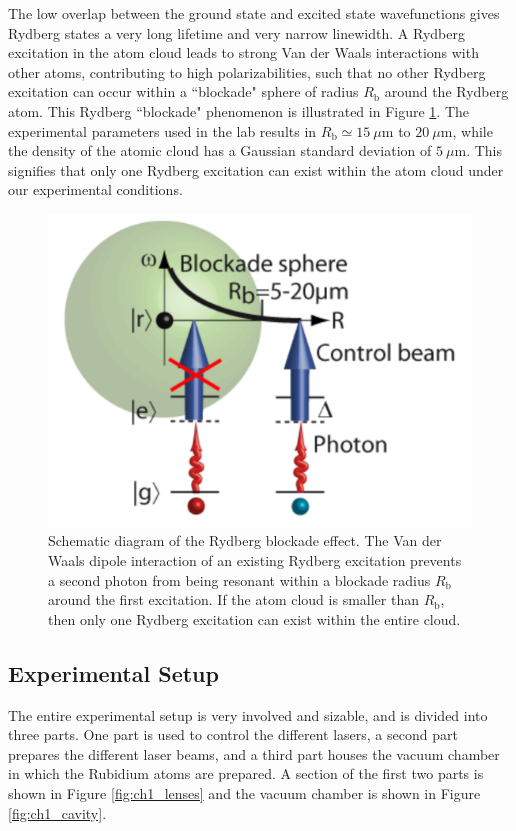 The low overlap between the ground state and excited state wavefunctions gives Rydberg states a very long lifetime and very narrow linewidth. A Rydberg excitation in the atom cloud leads to strong Van der Waals interactions with other atoms, contributing to high polarizabilities, such that no other Rydberg excitation can occur within a ``blockade" sphere of radius $R_\text{b}$ around the Rydberg atom. This Rydberg ``blockade" phenomenon is illustrated in Figure \ref{fig:ch1_blockade_sphere}. The experimental parameters used in the lab results in $R_\text{b} \simeq 15\ \mu\text{m}$ to $20\ \mu\text{m}$, while the density of the atomic cloud has a Gaussian standard deviation of $5\ \mu\text{m}$. This signifies that only one Rydberg excitation can exist within the atom cloud under our experimental conditions.

\begin{figure}[ht]
    \centering
    \includegraphics[width=0.4\columnwidth]{images/chapter_1/blockade_sphere.png}
    \caption{Schematic diagram of the Rydberg blockade effect. The Van der Waals dipole interaction of an existing Rydberg excitation prevents a second photon from being resonant within a blockade radius $R_\text{b}$ around the first excitation. If the atom cloud is smaller than $R_\text{b}$, then only one Rydberg excitation can exist within the entire cloud.}
    \label{fig:ch1_blockade_sphere}
\end{figure}

\subsection{Experimental Setup}

The entire experimental setup is very involved and sizable, and is divided into three parts. One part is used to control the different lasers, a second part prepares the different laser beams, and a third part houses the vacuum chamber in which the Rubidium atoms are prepared. A section of the first two parts is shown in Figure \ref{fig:ch1_lenses} and the vacuum chamber is shown in Figure \ref{fig:ch1_cavity}.

